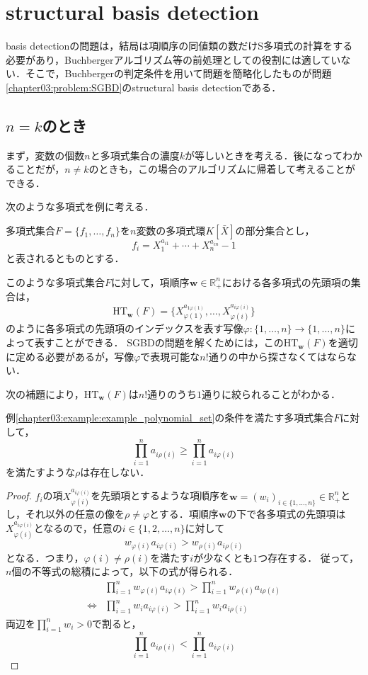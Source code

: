 \section{structural \groebner{} basis detection\cite{sturmfels1997structural}}
\groebner{} basis detectionの問題は，結局は項順序の同値類の数だけS多項式の計算をする必要があり，Buchbergerアルゴリズム等の前処理としての役割には適していない．そこで，Buchbergerの判定条件を用いて問題を簡略化したものが問題\ref{chapter03:problem:SGBD}のstructural \groebner{} basis detectionである．
\subsection{$n = k$のとき}
まず，変数の個数$n$と多項式集合の濃度$k$が等しいときを考える．後になってわかることだが，$n \ne k$のときも，この場合のアルゴリズムに帰着して考えることができる．
\par
次のような多項式を例に考える．
\begin{example}
	\label{chapter03:example:example_polynomial_set}
	多項式集合$F = \{f_1, \dots, f_n\}$を$n$変数の多項式環$K[\bar{X}]$の部分集合とし，
	$$f_i = X_{1}^{a_{i1}} + \cdots + X_n^{a_{in}} - 1$$
	と表されるとものとする．
\end{example}
このような多項式集合$F$に対して，項順序$\bm{w} \in \mathbb{R}_{+}^n$における各多項式の先頭項の集合は，
$$\mathrm{HT}_{\bm{w}}(F) = \{X_{\varphi(1)}^{a_{1\varphi(1)}}, \dots, X_{\varphi(i)}^{a_{i\varphi(i)}}\}$$
のように各多項式の先頭項のインデックスを表す写像$\varphi: \{1, \dots, n\} \to \{1, \dots, n\}$によって表すことができる．
SGBDの問題を解くためには，この$\mathrm{HT}_{\bm{w}}(F)$を適切に定める必要があるが，写像$\varphi$で表現可能な$n!$通りの中から探さなくてはならない．
\par
次の補題により，$\mathrm{HT}_{\bm{w}}(F)$は$n!$通りのうち$1$通りに絞られることがわかる．
\begin{lemma}
	\label{chapter03:lemma:bipartite_graph}
	例\ref{chapter03:example:example_polynomial_set}の条件を満たす多項式集合$F$に対して，
	$$\prod_{i=1}^n a_{i\rho(i)} \ge \prod_{i=1}^n a_{i\varphi(i)}$$
	を満たすような$\rho$は存在しない．
\end{lemma}
\begin{proof}
	$f_i$の項$X_{\varphi(i)}^{a_{i\varphi(i)}}$を先頭項とするような項順序を$\bm{w} = (w_i)_{i \in \{1, \dots, n\}} \in \mathbb{R}_{+}^n$とし，それ以外の任意の像を$\rho \ne \varphi$とする．項順序$\bm{w}$の下で各多項式の先頭項は$X_{\varphi(i)}^{a_{i\varphi(i)}}$となるので，任意の$i \in \{1, 2, \dots, n\}$に対して
	$$w_{\varphi(i)}a_{i\varphi(i)} > w_{\rho(i)}a_{i\rho(i)}$$
	となる．つまり，$\varphi(i) \ne \rho(i)$を満たす$i$が少なくとも$1$つ存在する．
	従って，$n$個の不等式の総積によって，以下の式が得られる．
	\begin{align}
		& \prod_{i=1}^n w_{\varphi(i)}a_{i\varphi(i)} > \prod_{i=1}^n w_{\rho(i)}a_{i\rho(i)} \\
		\Longleftrightarrow & \prod_{i=1}^n w_i a_{i\varphi(i)} > \prod_{i=1}^n w_i a_{i\rho(i)}
	\end{align}
	両辺を$\displaystyle \prod_{i=1}^n w_i > 0$で割ると，
	$$\prod_{i=1}^n a_{i\rho(i)} < \prod_{i=1}^n a_{i\varphi(i)}$$
\end{proof}

